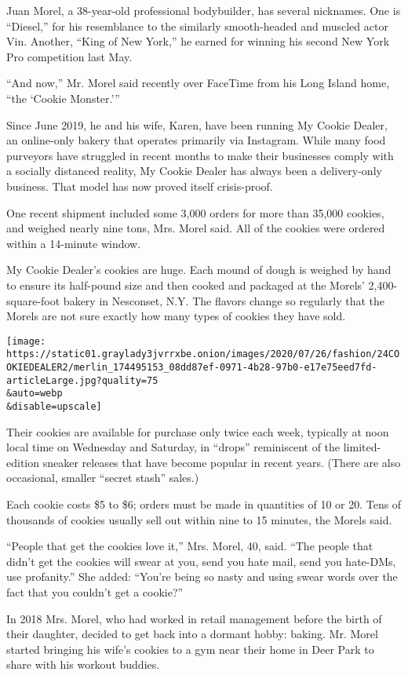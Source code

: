 Juan Morel, a 38-year-old professional bodybuilder, has several
nicknames. One is ``Diesel,'' for his resemblance to the similarly
smooth-headed and muscled actor Vin. Another, ``King of New York,'' he
earned for winning his second New York Pro competition last May.

``And now,'' Mr. Morel said recently over FaceTime from his Long Island
home, ``the `Cookie Monster.'''

Since June 2019, he and his wife, Karen, have been running My Cookie
Dealer, an online-only bakery that operates primarily via Instagram.
While many food purveyors have struggled in recent months to make their
businesses comply with a socially distanced reality, My Cookie Dealer
has always been a delivery-only business. That model has now proved
itself crisis-proof.

One recent shipment included some 3,000 orders for more than 35,000
cookies, and weighed nearly nine tons, Mrs. Morel said. All of the
cookies were ordered within a 14-minute window.

My Cookie Dealer's cookies are huge. Each mound of dough is weighed by
hand to ensure its half-pound size and then cooked and packaged at the
Morels' 2,400-square-foot bakery in Nesconset, N.Y. The flavors change
so regularly that the Morels are not sure exactly how many types of
cookies they have sold.

\texttt{[image: https://static01.graylady3jvrrxbe.onion/images/2020/07/26/fashion/24COOKIEDEALER2/merlin\_174495153\_08dd87ef-0971-4b28-97b0-e17e75eed7fd-articleLarge.jpg?quality=75\\\&auto=webp\\\&disable=upscale]}

Their cookies are available for purchase only twice each week, typically
at noon local time on Wednesday and Saturday, in ``drops'' reminiscent
of the limited-edition sneaker releases that have become popular in
recent years. (There are also occasional, smaller ``secret stash''
sales.)

Each cookie costs \$5 to \$6; orders must be made in quantities of 10 or
20. Tens of thousands of cookies usually sell out within nine to 15
minutes, the Morels said.

``People that get the cookies love it,'' Mrs. Morel, 40, said. ``The
people that didn't get the cookies will swear at you, send you hate
mail, send you hate-DMs, use profanity.'' She added: ``You're being so
nasty and using swear words over the fact that you couldn't get a
cookie?''

In 2018 Mrs. Morel, who had worked in retail management before the birth
of their daughter, decided to get back into a dormant hobby: baking. Mr.
Morel started bringing his wife's cookies to a gym near their home in
Deer Park to share with his workout buddies.


